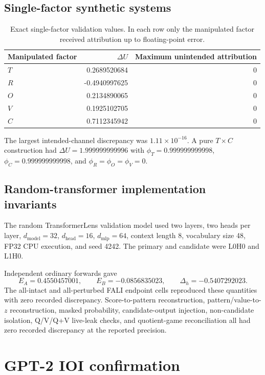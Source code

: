 \documentclass[pdflatex,sn-mathphys-ay]{sn-jnl}
\begin{document}
\subsection{Single-factor synthetic systems}

\begin{table}[h]
\centering
\caption{Exact single-factor validation values. In each row only the manipulated
factor received attribution up to floating-point error.}
\begin{tabular}{lrr}
\toprule
Manipulated factor & $\Delta U$ & Maximum unintended attribution \\
\midrule
$T$ & 0.2689520684 & 0 \\
$R$ & -0.4940997625 & 0 \\
$O$ & 0.2134890065 & 0 \\
$V$ & 0.1925102705 & 0 \\
$C$ & 0.7112345942 & 0 \\
\bottomrule
\end{tabular}
\end{table}

The largest intended-channel discrepancy was
$1.11\times 10^{-16}$. A pure $T\times C$ construction had
$\Delta U=1.999999999996$ with
$\phi_T=0.999999999998$,
$\phi_C=0.999999999998$, and
$\phi_R=\phi_O=\phi_V=0$.

\subsection{Random-transformer implementation invariants}

The random TransformerLens validation model used two layers, two heads per layer,
$d_{\mathrm{model}}=32$, $d_{\mathrm{head}}=16$, $d_{\mathrm{mlp}}=64$,
context length 8, vocabulary size 48, FP32 CPU execution, and seed 4242.
The primary and candidate were L0H0 and L1H0.

Independent ordinary forwards gave
\[
E_A=0.4550457001,\qquad
E_B=-0.0856835023,\qquad
\Delta_h=-0.5407292023.
\]
The all-intact and all-perturbed FALI endpoint cells reproduced these quantities
with zero recorded discrepancy. Score-to-pattern reconstruction,
pattern/value-to-$z$ reconstruction, masked probability, candidate-output
injection, non-candidate isolation, Q/V/Q+V live-leak checks, and quotient-game
reconciliation all had zero recorded discrepancy at the reported precision.

\section{GPT-2 IOI confirmation}
\end{document}
